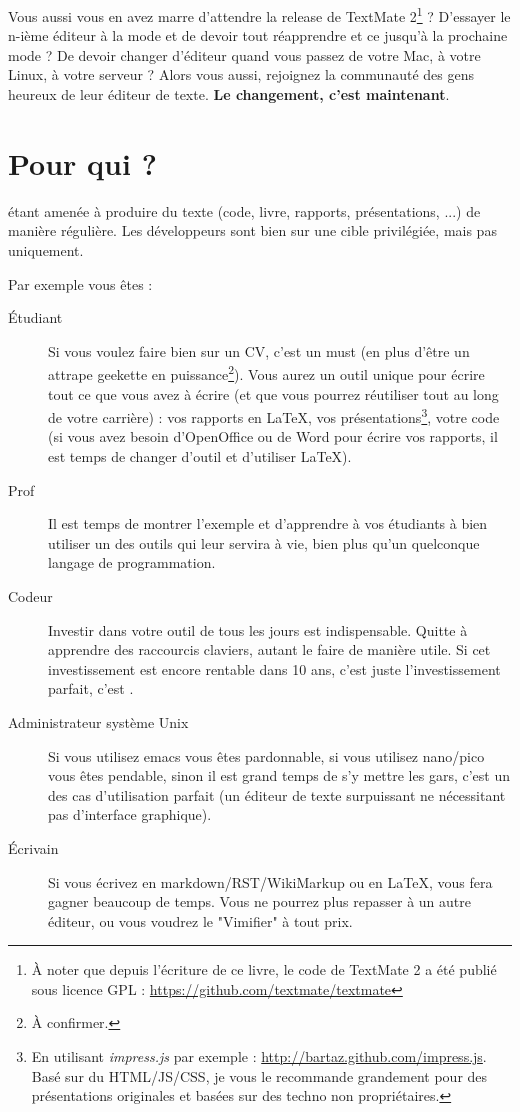 Vous aussi vous en avez marre d'attendre la release de TextMate 2\footnote{À noter que depuis l'écriture de ce livre, le code de TextMate 2 a été publié sous licence GPL : \url{https://github.com/textmate/textmate}} ? D'essayer le n-ième éditeur à la mode et de devoir tout réapprendre et ce jusqu'à la prochaine mode ? De devoir changer d'éditeur quand vous passez de votre Mac, à votre Linux, à votre serveur ? Alors vous aussi, rejoignez la communauté des gens heureux de leur éditeur de texte. \textbf{Le changement, c'est maintenant}.

\section{Pour qui ?}

 étant amenée à produire du texte (code, livre, rapports, présentations, ...) de manière régulière. Les développeurs sont bien sur une cible privilégiée, mais pas uniquement.

Par exemple vous êtes :
\begin{description}
    \item[Étudiant] Si vous voulez faire bien sur un CV, c'est un must (en plus d'être un attrape geekette en puissance\footnote{À confirmer.}). Vous aurez un outil unique pour écrire tout ce que vous avez à écrire (et que vous pourrez réutiliser tout au long de votre carrière) : vos rapports en \LaTeX, vos présentations\footnote{En utilisant \emph{impress.js} par exemple : \url{http://bartaz.github.com/impress.js}. Basé sur du HTML/JS/CSS, je vous le recommande grandement pour des présentations originales et basées sur des techno non propriétaires.}, votre code (si vous avez besoin d'OpenOffice ou de Word pour écrire vos rapports, il est temps de changer d'outil et d'utiliser \LaTeX).
    \item[Prof] Il est temps de montrer l'exemple et d'apprendre à vos étudiants à bien utiliser un des outils qui leur servira à vie, bien plus qu'un quelconque langage de programmation.
    \item[Codeur] Investir dans votre outil de tous les jours est indispensable. Quitte à apprendre des raccourcis claviers, autant le faire de manière utile. Si cet investissement est encore rentable dans 10 ans, c'est juste l'investissement parfait, c'est \vim.
    \item[Administrateur système Unix] Si vous utilisez emacs vous êtes pardonnable, si vous utilisez nano/pico vous êtes pendable, sinon il est grand temps de s'y mettre les gars, c'est un des cas d'utilisation parfait (un éditeur de texte surpuissant ne nécessitant pas d'interface graphique).
    \item[Écrivain] Si vous écrivez en markdown/RST/WikiMarkup ou en \LaTeX, \vim vous fera gagner beaucoup de temps. Vous ne pourrez plus repasser à un autre éditeur, ou vous voudrez le "Vimifier" à tout prix.
\end{description}

